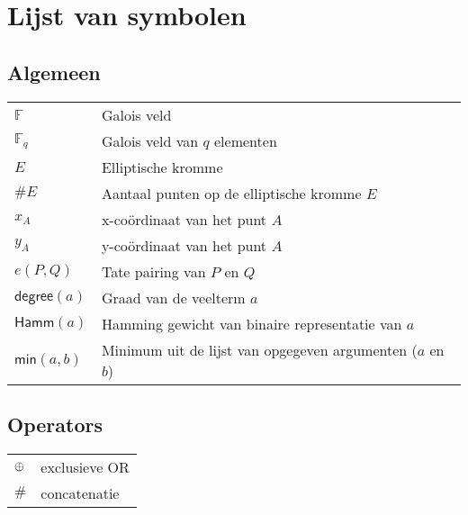 \chapter*{Lijst van symbolen}

\section*{Algemeen}

\begin{tabular}{l@{$\qquad$}l}
$\mathbb{F}$	& Galois veld\\
$\mathbb{F}_q$	& Galois veld van $q$ elementen\\
$E$				& Elliptische kromme\\
$\#E$				& Aantaal punten op de elliptische kromme $E$\\
$x_A$				& x-co\"ordinaat van het punt $A$\\
$y_A$				& y-co\"ordinaat van het punt $A$\\
$e(P, Q)$		& Tate pairing van $P$ en $Q$\\
$\textsf{degree}(a)$	& Graad van de veelterm $a$\\
$\textsf{Hamm}(a)$	& Hamming gewicht van binaire representatie van $a$\\
$\textsf{min}(a, b)$	& Minimum  uit de lijst van opgegeven argumenten ($a$ en $b$)\\
\end{tabular}

\section*{Operators}

\begin{tabular}{l@{$\qquad$}l}
$\oplus$	&	exclusieve OR\\
$\#$		&	concatenatie\\
\end{tabular}
